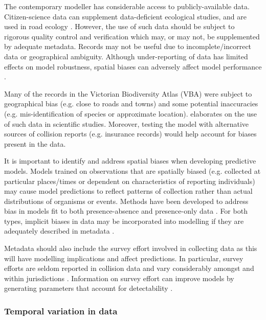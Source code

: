 The contemporary modeller has considerable access to publicly-available data. Citizen-science data can supplement data-deficient ecological studies, and are used in road ecology \citep{paul14}. However, the use of such data should be subject to rigorous quality control and verification which may, or may not, be supplemented by adequate metadata. Records may not be useful due to incomplete/incorrect data or geographical ambiguity. Although under-reporting of data has limited effects on model robustness, spatial biases can adversely affect model performance \citep{snow15}.


Many of the records in the Victorian Biodiversity Atlas (VBA) were subject to geographical bias (e.g. close to roads and towns) and some potential inaccuracies (e.g. mis-identification of species or approximate location). \cite{grah04} elaborates on the use of such data in scientific studies. Moreover, testing the model with alternative sources of collision reports (e.g. insurance records) would help account for biases present in the data.



It is important to identify and address spatial biases when developing predictive models. Models trained on observations that are spatially biased (e.g. collected at particular places/times or dependent on characteristics of reporting individuals) may cause model predictions to reflect patterns of collection rather than actual distributions of organisms or events. Methods have been developed to address bias in models fit to both presence-absence \citep{} and presence-only data \citep{kram13}. For both types, implicit biases in data may be incorporated into modelling if they are adequately described in metadata \citep{wart13}.

Metadata should also include the survey effort involved in collecting data as this will have modelling implications and affect predictions. In particular, survey efforts are seldom reported in collision data and vary considerably amongst and within jurisdictions \citep{huij07a}. Information on survey effort can improve models by generating parameters that account for detectability \citep{dora14}.



\subsubsection{Temporal variation in data}

